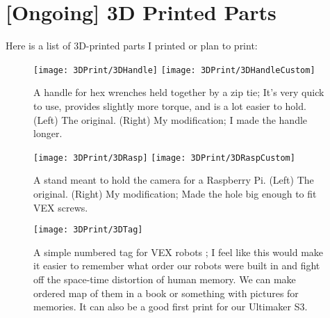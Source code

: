 \section{[Ongoing] 3D Printed Parts}
Here is a list of 3D-printed parts I printed or plan to print:

\begin{figure}[h]
    \centering
    \texttt{[image: 3DPrint/3DHandle]}
    \texttt{[image: 3DPrint/3DHandleCustom]}
    \caption{
        A handle for hex wrenches held together by a zip tie; It's very quick to use, provides slightly more torque, and is a lot easier to hold. (Left) The original. \cite{3DHandle} (Right) My modification; I made the handle longer.
    }
\end{figure}


\begin{figure}[h]
    \centering
    \texttt{[image: 3DPrint/3DRasp]}
    \texttt{[image: 3DPrint/3DRaspCustom]}
    \caption{
        A stand meant to hold the camera for a Raspberry Pi. (Left) The original. \cite{3DRasp} (Right) My modification; Made the hole big enough to fit VEX screws.
    }
\end{figure}

\begin{figure}[h]
    \centering
    \texttt{[image: 3DPrint/3DTag]}
    \caption{
        A simple numbered tag for VEX robots \cite{3DTag}; I feel like this would make it easier to remember what order our robots were built in and fight off the space-time distortion of human memory. We can make ordered map of them in a book or something with pictures for memories. It can also be a good first print for our Ultimaker S3.
    }
\end{figure}
